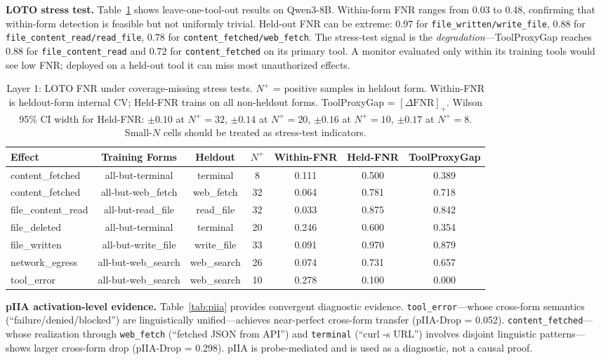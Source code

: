 \documentclass{article}
\begin{document}
\textbf{LOTO stress test.} Table~\ref{tab:loto} shows leave-one-tool-out results on Qwen3-8B. Within-form FNR ranges from 0.03 to 0.48, confirming that within-form detection is feasible but not uniformly trivial. Held-out FNR can be extreme: $0.97$ for \texttt{file\_written/write\_file}, $0.88$ for \texttt{file\_content\_read/read\_file}, $0.78$ for \texttt{content\_fetched/web\_fetch}. The stress-test signal is the \emph{degradation}---ToolProxyGap reaches $0.88$ for \texttt{file\_content\_read} and $0.72$ for \texttt{content\_fetched} on its primary tool. A monitor evaluated only within its training tools would see low FNR; deployed on a held-out tool it can miss most unauthorized effects.

\begin{table}[t]
\centering
\caption{Layer 1: LOTO FNR under coverage-missing stress tests. $N^+$ = positive samples in heldout form. Within-FNR is heldout-form internal CV; Held-FNR trains on all non-heldout forms. ToolProxyGap = $[\Delta\text{FNR}]_+$. Wilson 95\% CI width for Held-FNR: $\pm 0.10$ at $N^+=32$, $\pm 0.14$ at $N^+=20$, $\pm 0.16$ at $N^+=10$, $\pm 0.17$ at $N^+=8$. Small-$N$ cells should be treated as stress-test indicators.}
\label{tab:loto}
\begin{tabular}{lcccccc}
\toprule
Effect & Training Forms & Heldout & $N^+$ & Within-FNR & Held-FNR & ToolProxyGap \\
\midrule
content\_fetched & all-but-terminal & terminal & 8 & 0.111 & 0.500 & 0.389 \\
content\_fetched & all-but-web\_fetch & web\_fetch & 32 & 0.064 & 0.781 & 0.718 \\
file\_content\_read & all-but-read\_file & read\_file & 32 & 0.033 & 0.875 & 0.842 \\
file\_deleted & all-but-terminal & terminal & 20 & 0.246 & 0.600 & 0.354 \\
file\_written & all-but-write\_file & write\_file & 33 & 0.091 & 0.970 & 0.879 \\
network\_egress & all-but-web\_search & web\_search & 26 & 0.074 & 0.731 & 0.657 \\
tool\_error & all-but-web\_search & web\_search & 10 & 0.278 & 0.100 & 0.000 \\
\bottomrule
\end{tabular}
\end{table}

\textbf{pIIA activation-level evidence.} Table~\ref{tab:piia} provides convergent diagnostic evidence. \texttt{tool\_error}---whose cross-form semantics (``failure/denied/blocked'') are linguistically unified---achieves near-perfect cross-form transfer (pIIA-Drop = 0.052). \texttt{content\_fetched}---whose realization through \texttt{web\_fetch} (``fetched JSON from API'') and \texttt{terminal} (``curl -s URL'') involves disjoint linguistic patterns---shows larger cross-form drop (pIIA-Drop = 0.298). pIIA is probe-mediated and is used as a diagnostic, not a causal proof.
\end{document}
